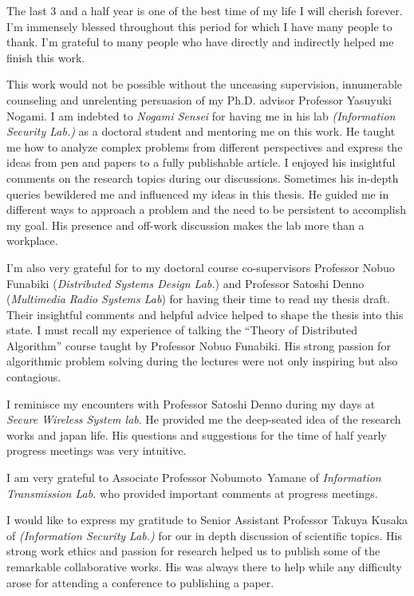 The last 3 and a half year is one of the best time of my life I will cherish forever. 
I'm immensely blessed throughout this period for which I have many people to thank.
I'm grateful to many people who have directly and indirectly helped me finish this work.

\vspace{5pt}
This work would not be possible without the unceasing supervision, innumerable counseling and unrelenting persuasion of my Ph.D. advisor Professor Yasuyuki Nogami.
I am indebted to \textit{Nogami Sensei} for having me in his lab \textit{(Information Security Lab.)} as a doctoral student and mentoring me on this work.
He taught me how to analyze complex problems from different perspectives and express the ideas from pen and papers to a fully publishable article.
I enjoyed his insightful comments on the research topics during our discussions.
Sometimes his in-depth queries bewildered me and influenced my ideas in this thesis.
He guided me in different ways to approach a problem and the need to be persistent to accomplish my goal.
His presence and off-work discussion makes the lab more than a workplace. 

\vspace{5pt}
I’m also very grateful for to my doctoral course co-supervisors Professor Nobuo Funabiki (\textit{Distributed Systems Design Lab.}) and Professor Satoshi Denno (\textit{Multimedia Radio Systems Lab}) for having their time to read my thesis draft.
Their insightful comments and helpful advice helped to shape the thesis into this state.
I must recall my experience of talking the “Theory of Distributed Algorithm” course taught by Professor Nobuo Funabiki.
His strong passion for algorithmic problem solving during the lectures were not only inspiring but also contagious. 

\vspace{5pt}
I reminisce my encounters with Professor Satoshi Denno during my days at \textit{Secure Wireless System lab}.
He provided me the  deep-seated idea of the research works and japan life.
His questions and suggestions for the time of half yearly progress meetings was very intuitive. 

\vspace{5pt}
I am very grateful to Associate Professor \mbox{Nobumoto Yamane} of \textit{Information Transmission Lab.} who provided  important comments at progress meetings.

\vspace{5pt}
I would like to express my gratitude to Senior Assistant Professor Takuya Kusaka of \textit{(Information Security Lab.)} for our in depth discussion of  scientific topics.
His strong work ethics and passion for research helped us to publish some of the remarkable collaborative works. 
His was always there to help  while any difficulty arose for attending a conference to publishing a paper.  

